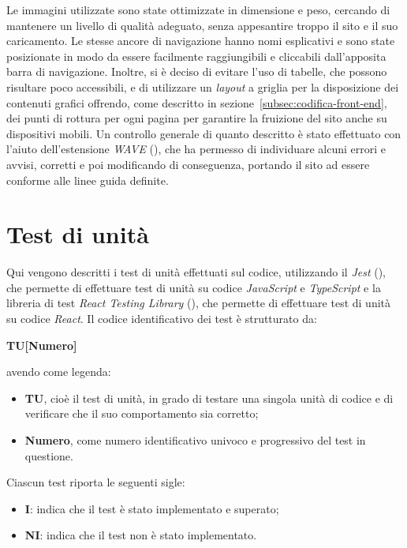 Le immagini utilizzate sono state ottimizzate in dimensione e peso, cercando di mantenere un livello di qualità adeguato, senza appesantire troppo il sito e il suo caricamento.
Le stesse ancore di navigazione hanno nomi esplicativi e sono state posizionate in modo da essere facilmente raggiungibili e cliccabili dall'apposita barra di navigazione.
Inoltre, si è deciso di evitare l'uso di tabelle, che possono risultare poco accessibili, e di utilizzare un \textit{layout} a griglia per la disposizione dei contenuti grafici offrendo, come descritto in sezione~\ref{subsec:codifica-front-end}, dei punti di rottura per ogni pagina per garantire la fruizione del sito anche su dispositivi mobili.
Un controllo generale di quanto descritto è stato effettuato con l'aiuto dell'estensione \textit{WAVE} (\cite{site:wave}), che ha permesso di individuare alcuni errori e avvisi, corretti e poi modificando di conseguenza,
portando il sito ad essere conforme alle linee guida definite. 

\section{Test di unità}\label{sec:verifica-validazione-test}

Qui vengono descritti i test di unità effettuati sul codice, utilizzando il  \textit{Jest} (\cite{site:jest}), che permette di effettuare test di unità su codice \textit{JavaScript} e \textit{TypeScript}
e la libreria di test \textit{React Testing Library} (\cite{site:reacttestinglibrary}), che permette di effettuare test di unità su codice \textit{React}.
Il codice identificativo dei test è strutturato da:
\begin{center}
    \textbf{TU[Numero]}
  \end{center}
\textbf{}
avendo come legenda:
\begin{itemize}
\item \textbf{TU}, cioè il test di unità, in grado di testare una singola unità di codice e di verificare che il suo comportamento sia corretto;
\item \textbf{Numero}, come numero identificativo univoco e progressivo del test in questione.
\end{itemize}

Ciascun test riporta le seguenti sigle:
\begin{itemize}
\item \textbf{I}: indica che il test è stato implementato e superato;
\item \textbf{NI}: indica che il test non è stato implementato.
\end{itemize}

